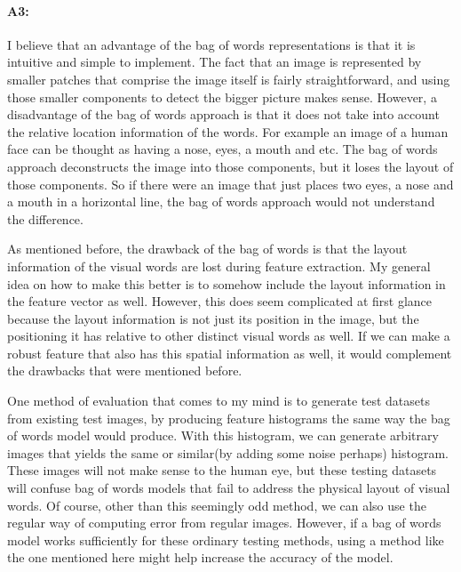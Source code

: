 \paragraph{A3:} I believe that an advantage of the bag of words representations is that it is intuitive and simple to implement. The fact that an image is represented by smaller patches that comprise the image itself is fairly straightforward, and using those smaller components to detect the bigger picture makes sense. However, a disadvantage of the bag of words approach is that it does not take into account the relative location information of the words. For example an image of a human face can be thought as having a nose, eyes, a mouth and etc. The bag of words approach deconstructs the image into those components, but it loses the layout of those components. So if there were an image that just places two eyes, a nose and a mouth in a horizontal line, the bag of words approach would not understand the difference.

As mentioned before, the drawback of the bag of words is that the layout information of the visual words are lost during feature extraction. My general idea on how to make this better is to somehow include the layout information in the feature vector as well. However, this does seem complicated at first glance because the layout information is not just its position in the image, but the positioning it has relative to other distinct visual words as well. If we can make a robust feature that also has this spatial information as well, it would complement the drawbacks that were mentioned before.

One method of evaluation that comes to my mind is to generate test datasets from existing test images, by producing feature histograms the same way the bag of words model would produce. With this histogram, we can generate arbitrary images that yields the same or similar(by adding some noise perhaps) histogram. These images will not make sense to the human eye, but these testing datasets will confuse bag of words models that fail to address the physical layout of visual words. Of course, other than this seemingly odd method, we can also use the regular way of computing error from regular images. However, if a bag of words model works sufficiently for these ordinary testing methods, using a method like the one mentioned here might help increase the accuracy of the model.


